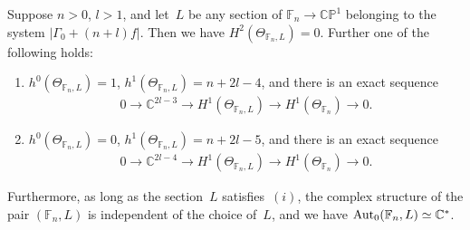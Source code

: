 \begin{Proposition}\label{prop:l2}
Suppose $n>0$, $l>1$, and let~$L$ be any section of $\mathbb{F}_n\to \mathbb{CP}^1$ belonging to the system $|\Gamma_0+(n+l)f|$.
Then we have $H^2(\Theta_{\mathbb{F}_n,L})=0$.
Further one of the following holds:
\begin{enumerate}\itemsep=0pt
\item[$(i)$] $h^0(\Theta_{\mathbb{F}_n, L}) = 1$, $h^1(\Theta_{\mathbb{F}_n, L}) = n+2l-4$, and there is an exact
sequence
\begin{gather*}
0
\longrightarrow
\mathbb{C}^{2l-3}
\longrightarrow
H^1(\Theta_{\mathbb{F}_n,L})
\longrightarrow
H^1(\Theta_{\mathbb{F}_n})
\longrightarrow
0.
\end{gather*}
\item[$(ii)$] $h^0(\Theta_{\mathbb{F}_n, L}) = 0$, $h^1(\Theta_{\mathbb{F}_n, L}) = n+2l-5$, and there is an exact
sequence
\begin{gather*}
0
\longrightarrow
\mathbb{C}^{2l-4}
\longrightarrow
H^1(\Theta_{\mathbb{F}_n,L})
\longrightarrow
H^1(\Theta_{\mathbb{F}_n})
\longrightarrow
0.
\end{gather*}
\end{enumerate}
Furthermore, as long as the section~$L$ satisfies~$(i)$, the complex structure of the pair $(\mathbb{F}_n,L)$ is
independent of the choice of~$L$, and we have ${\rm{Aut}}_0(\mathbb{F}_n, L) \simeq \mathbb{C}^*$.
\end{Proposition}


